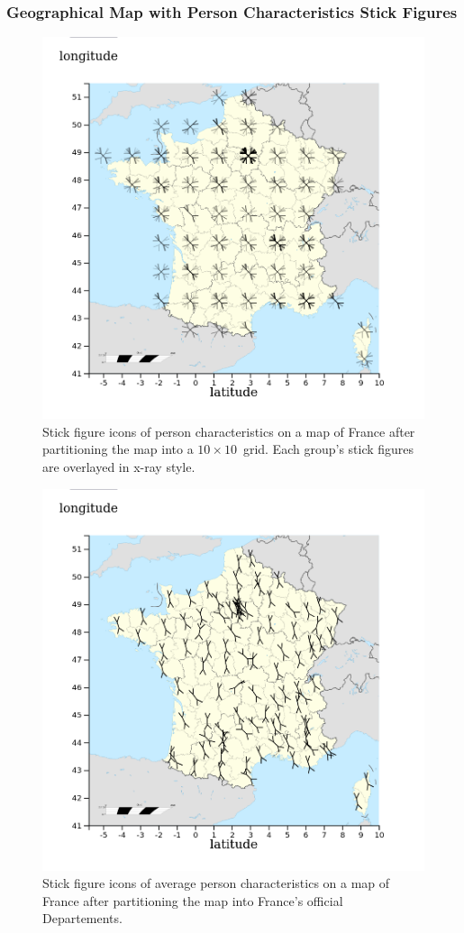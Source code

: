 \subsubsection{Geographical Map with Person Characteristics Stick Figures}
\begin{figure}
    \centering
    \includegraphics[width=0.6\linewidth]{figures/stick-figures-by-grid-10-10-xray}
    \caption{Stick figure icons of person characteristics on a map of France after partitioning the map into a \(10 \times 10\)~grid. Each group's stick figures are overlayed in x-ray style.}
    \label{figure-stick-figures-grid-xray}
\end{figure}
\begin{figure}
    \centering
    \includegraphics[width=0.6\linewidth]{figures/stick-figures-by-department-average}
    \caption{Stick figure icons of average person characteristics on a map of France after partitioning the map into France's official Departements.}
    \label{figure-stick-figures-departments-average}
\end{figure}
